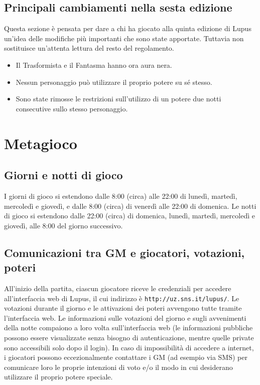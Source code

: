 \documentclass[a4paper,10pt]{article}
\begin{document}
\subsection{Principali cambiamenti nella sesta edizione}

Questa sezione è pensata per dare a chi ha giocato alla quinta edizione di Lupus un'idea delle modifiche più importanti che sono state apportate. Tuttavia non sostituisce un'attenta lettura del resto del regolamento.

\begin{itemize}
  \item Il Trasformista e il Fantasma hanno ora aura nera.
  \item Nessun personaggio può utilizzare il proprio potere su sé stesso.
  \item Sono state rimosse le restrizioni sull'utilizzo di un potere due notti consecutive sullo stesso personaggio.
\end{itemize}




\pagebreak
\section{Metagioco}

\subsection{Giorni e notti di gioco}

I giorni di gioco si estendono dalle 8:00 (circa) alle 22:00 di lunedì, martedì, mercoledì e giovedì, e dalle 8:00 (circa) di venerdì alle 22:00 di domenica. Le notti di gioco si estendono dalle 22:00 (circa) di domenica, lunedì, martedì, mercoledì e giovedì, alle 8:00 del giorno successivo.


\subsection{Comunicazioni tra GM e giocatori, votazioni, poteri}

All'inizio della partita, ciascun giocatore riceve le credenziali per accedere all'interfaccia web di Lupus, il cui indirizzo è \verb|http://uz.sns.it/lupus/|.
Le votazioni durante il giorno e le attivazioni dei poteri avvengono tutte tramite l'interfaccia web. Le informazioni sulle votazioni del giorno e sugli avvenimenti della notte compaiono a loro volta sull'interfaccia web (le informazioni pubbliche possono essere visualizzate senza bisogno di autenticazione, mentre quelle private sono accessibili solo dopo il login). In caso di impossibilità di accedere a internet, i giocatori possono eccezionalmente contattare i GM (ad esempio via SMS) per comunicare loro le proprie intenzioni di voto e/o il modo in cui desiderano utilizzare il proprio potere speciale.
\end{document}
